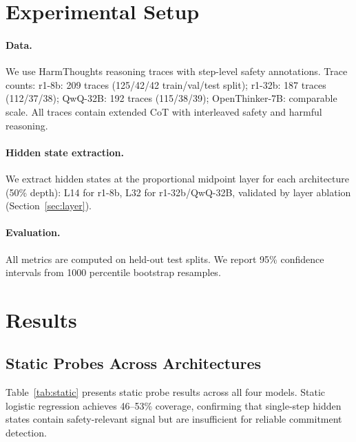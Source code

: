 \documentclass[11pt,a4paper]{article}
\begin{document}
\section{Experimental Setup}
\label{sec:setup}

\paragraph{Data.}
We use HarmThoughts reasoning traces with step-level safety annotations. Trace counts: r1-8b: 209 traces (125/42/42 train/val/test split); r1-32b: 187 traces (112/37/38); QwQ-32B: 192 traces (115/38/39); OpenThinker-7B: comparable scale. All traces contain extended CoT with interleaved safety and harmful reasoning.

\paragraph{Hidden state extraction.}
We extract hidden states at the proportional midpoint layer for each architecture (50\% depth): L14 for r1-8b, L32 for r1-32b/QwQ-32B, validated by layer ablation (Section~\ref{sec:layer}).

\paragraph{Evaluation.}
All metrics are computed on held-out test splits. We report 95\% confidence intervals from 1000 percentile bootstrap resamples.

\section{Results}
\label{sec:results}

\subsection{Static Probes Across Architectures}
\label{sec:static}

Table~\ref{tab:static} presents static probe results across all four models. Static logistic regression achieves 46--53\% coverage, confirming that single-step hidden states contain safety-relevant signal but are insufficient for reliable commitment detection.
\end{document}
